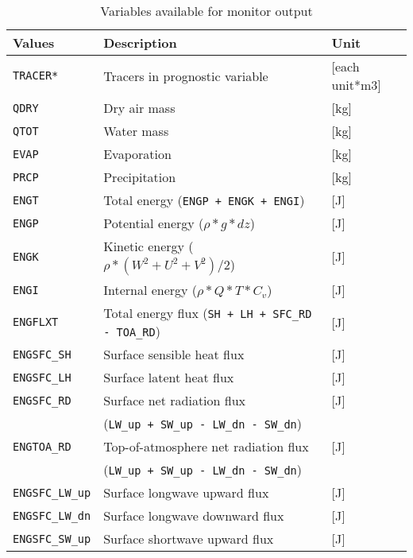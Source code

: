 \begin{table}[h]
\begin{center}
  \caption{Variables available for monitor output}
  \label{tab:varlist_monitor}
  \begin{tabularx}{150mm}{|l|X|l|} \hline
    \rowcolor[gray]{0.9}  Values & Description & Unit \\ \hline
      \verb|TRACER*|      & Tracers in prognostic variable            & [each unit*m3] \\
      \verb|QDRY|         & Dry air mass                              & [kg] \\
      \verb|QTOT|         & Water mass                                & [kg] \\
      \verb|EVAP|         & Evaporation                               & [kg] \\
      \verb|PRCP|         & Precipitation                             & [kg] \\
      \verb|ENGT|         & Total     energy (\verb|ENGP + ENGK + ENGI|)  & [J] \\
      \verb|ENGP|         & Potential energy ($\rho * g * dz$)            & [J] \\
      \verb|ENGK|         & Kinetic   energy ($\rho * (W^2+U^2+V^2) / 2$) & [J] \\
      \verb|ENGI|         & Internal  energy ($\rho * Q * T * C_v$)       & [J] \\
      \verb|ENGFLXT|      & Total energy flux (\verb|SH + LH + SFC_RD - TOA_RD|)  & [J] \\
      \verb|ENGSFC_SH|    & Surface sensible heat flux                & [J] \\
      \verb|ENGSFC_LH|    & Surface latent   heat flux                & [J] \\
      \verb|ENGSFC_RD|    & Surface net radiation flux                & [J] \\
                          & (\verb|LW_up + SW_up - LW_dn - SW_dn|)    &     \\
      \verb|ENGTOA_RD|    & Top-of-atmosphere net radiation flux      & [J] \\
                          & (\verb|LW_up + SW_up - LW_dn - SW_dn|)    &     \\
      \verb|ENGSFC_LW_up| & Surface longwave  upward   flux           & [J] \\
      \verb|ENGSFC_LW_dn| & Surface longwave  downward flux           & [J] \\
      \verb|ENGSFC_SW_up| & Surface shortwave upward   flux           & [J] \\

\end{tabularx}
\end{center}
\end{table}
